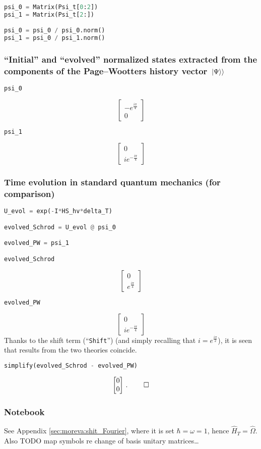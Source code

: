 \begin{lstlisting}[language=Python]
psi_0 = Matrix(Psi_t[0:2])
psi_1 = Matrix(Psi_t[2:])

psi_0 = psi_0 / psi_0.norm()
psi_1 = psi_0 / psi_1.norm()
\end{lstlisting}

\pagebreak\subsubsection*{``Initial'' and ``evolved'' normalized states extracted from the components of the Page--Wootters history vector $\left.\left| \Psi \right\rangle\right\rangle$}

\begin{lstlisting}[language=Python]
psi_0
\end{lstlisting}
$$
  \left[\begin{matrix}- e^{\frac{i \pi}{4}}\\0\end{matrix}\right]
$$
\begin{lstlisting}[language=Python]
psi_1
\end{lstlisting}
$$
  \left[\begin{matrix}0\\i e^{- \frac{i \pi}{4}}\end{matrix}\right]
$$

\subsubsection*{Time evolution in standard quantum mechanics (for comparison)}

\begin{lstlisting}[language=Python]
U_evol = exp(-I*HS_hv*delta_T)

evolved_Schrod = U_evol @ psi_0

evolved_PW = psi_1

evolved_Schrod
\end{lstlisting}
$$
  \left[\begin{matrix}0\\e^{\frac{i \pi}{4}}\end{matrix}\right]
$$
\begin{lstlisting}[language=Python]
evolved_PW
\end{lstlisting}
$$
  \left[\begin{matrix}0\\i e^{- \frac{i \pi}{4}}\end{matrix}\right]
$$
Thanks to the shift term (``\verb|Shift|'')
(and simply recalling that $i=e^{\frac{i\pi}{2}}$),
it is seen that
results from the two theories coincide.
\begin{lstlisting}[language=Python]
simplify(evolved_Schrod - evolved_PW)
\end{lstlisting}
$$
  \left[\begin{matrix}0\\0\end{matrix}\right] \, \text{.} \; \qed
$$

\subsubsection*{Notebook}

See Appendix \ref{sec:moreva:shit_Fourier}, where it is set $\hbar = \omega = 1$, hence $\hat{H}_T = \hat{\Omega}$.
Also TODO map symbols re change of basis unitary matrices\dots